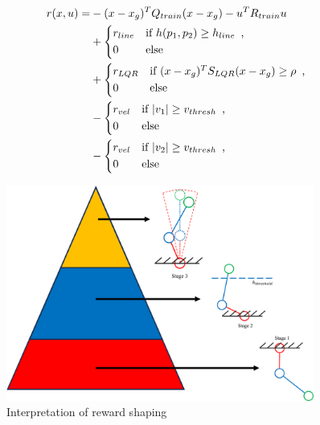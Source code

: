 \begin{equation}
\begin{aligned}
 r(x,u) = &-(x - x_g)^T Q_{train} (x - x_g) - u^T R_{train}u \nonumber\\
           & +
            \begin{dcases*}
              r_{line} & \text{if} $h(p_1, p_2) \geq h_{line}$\, ,\\
              0 & \text{else}
            \end{dcases*}\nonumber\\
           & +
            \begin{dcases*}
              r_{LQR} & \text{if} $(x - x_g)^T S_{LQR} (x - x_g) \geq \rho $\, ,\\
              0 & \text{else}
            \end{dcases*}\nonumber\\
           & -
            \begin{dcases*}
              r_{vel} & \text{if} $|v_1| \geq v_{thresh}$\, ,\\
              0 & \text{else}
            \end{dcases*}\nonumber\\
           & -
            \begin{dcases*}
              r_{vel} & \text{if} $|v_2| \geq v_{thresh}$\, ,\\
              0 & \text{else}
            \end{dcases*}
\end{aligned}
\end{equation}

\begin{figure}[htbp]
    \centering
    \includegraphics[width=0.9\textwidth]{figures/reward_explained.png} %
    \caption{Interpretation of reward shaping}
    \label{fig:example}
\end{figure}

\cleardoublepage
